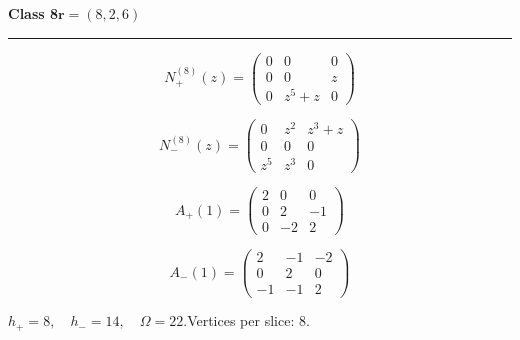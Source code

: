 \noindent\begin{minipage}{\linewidth}
\noindent\textbf{Class 8}\hfill $\symbf{r}=(8,2,6)$
\par\smallskip\noindent\textcolor{rulegray}{\rule{\linewidth}{0.3pt}}
\begin{minipage}[c]{0.495\linewidth}\centering\fontsize{10.5}{13}\selectfont
\setlength{\abovedisplayskip}{3pt}\setlength{\belowdisplayskip}{3pt}
\setlength{\abovedisplayshortskip}{3pt}\setlength{\belowdisplayshortskip}{3pt}
\setlength{\arraycolsep}{3.5pt}\renewcommand{\arraystretch}{1.18}
\[N_{+}^{(8)}(z)=\begin{pmatrix}0 & 0 & 0\\0 & 0 & z\\0 & z^{5} + z & 0\end{pmatrix}\]
\end{minipage}%
\begin{minipage}[c]{0.495\linewidth}\centering\fontsize{10.5}{13}\selectfont
\setlength{\abovedisplayskip}{3pt}\setlength{\belowdisplayskip}{3pt}
\setlength{\abovedisplayshortskip}{3pt}\setlength{\belowdisplayshortskip}{3pt}
\setlength{\arraycolsep}{3.5pt}\renewcommand{\arraystretch}{1.18}
\[N_{-}^{(8)}(z)=\begin{pmatrix}0 & z^{2} & z^{3} + z\\0 & 0 & 0\\z^{5} & z^{3} & 0\end{pmatrix}\]
\end{minipage}%
\par\noindent
\begin{minipage}[c]{0.495\linewidth}\centering\fontsize{10.5}{13}\selectfont
\setlength{\abovedisplayskip}{3pt}\setlength{\belowdisplayskip}{3pt}
\setlength{\abovedisplayshortskip}{3pt}\setlength{\belowdisplayshortskip}{3pt}
\setlength{\arraycolsep}{3.5pt}\renewcommand{\arraystretch}{1.18}
\[A_{+}(1)=\begin{pmatrix}2 & 0 & 0\\0 & 2 & -1\\0 & -2 & 2\end{pmatrix}\]
\end{minipage}%
\begin{minipage}[c]{0.495\linewidth}\centering\fontsize{10.5}{13}\selectfont
\setlength{\abovedisplayskip}{3pt}\setlength{\belowdisplayskip}{3pt}
\setlength{\abovedisplayshortskip}{3pt}\setlength{\belowdisplayshortskip}{3pt}
\setlength{\arraycolsep}{3.5pt}\renewcommand{\arraystretch}{1.18}
\[A_{-}(1)=\begin{pmatrix}2 & -1 & -2\\0 & 2 & 0\\-1 & -1 & 2\end{pmatrix}\]
\end{minipage}%
\par\smallskip\noindent\small $h_+=8,\quad h_-=14,\quad \Omega=22.$\quad Vertices per slice: 8.
\end{minipage}\par\vfill
\clearpage
